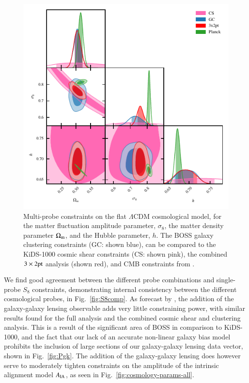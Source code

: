 \begin{figure}
	\begin{center}
		\includegraphics[width=\columnwidth]{Parameter_Plots/cosmology/omegam_sigma8_h_blind_C}
		\caption{Multi-probe constraints on the flat $\Lambda$CDM cosmological model, for the matter fluctuation amplitude parameter, $\sigma_8$, the matter density parameter $\Omega_{\rm m}$, and the Hubble parameter, $h$.  The BOSS galaxy clustering constraints (GC: shown blue), can be compared to the KiDS-1000 cosmic shear constraints (CS: shown pink), the combined $3\times2{\rm pt}$ analysis (shown red), and CMB constraints from \citet{planck/etal:2018}.}
		\label{fig:cosmology-params}
	\end{center}
\end{figure}

We find good agreement between the different probe combinations and single-probe $S_8$ constraints, demonstrating internal consistency between the different cosmological probes, in Fig.~\ref{fig:S8comp}.  
As forecast by \citet{joachimi/etal:inprep}, the addition of the galaxy-galaxy lensing observable adds very little constraining power, with similar results found for the full \tttp analysis and the combined cosmic shear and clustering analysis. 
This is a result of the significant area of BOSS in comparison to KiDS-1000, and the fact that our lack of an accurate non-linear galaxy bias model  prohibits the inclusion of large sections of our galaxy-galaxy lensing data vector, shown in Fig.~\ref{fig:Pgk}.  
The addition of the galaxy-galaxy lensing does however serve to moderately tighten constraints on the amplitude of the intrinsic alignment model $A_{\rm IA}$,  as seen in Fig.~\ref{fig:cosmology-params-all}. 


